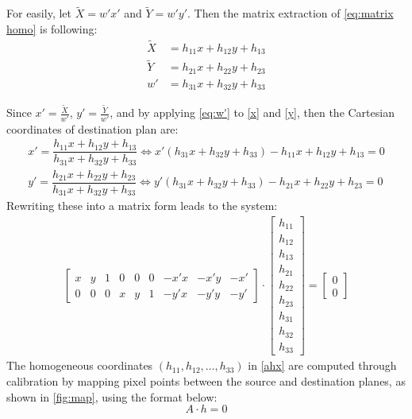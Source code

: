 \documentclass{rithy-thesis}
\begin{document}
\noindent For easily, let $\tilde{X} = w'x'$ and $\tilde{Y} = w'y'$. Then the matrix extraction of \eqref{eq:matrix homo} is following:
\begin{align}
    \tilde{X} &= h_{11}x+h_{12}y+h_{13} \label{x}\\
    \tilde{Y} &= h_{21}x+h_{22}y+h_{23} \label{y}\\
    w' &= h_{31}x+h_{32}y+h_{33} \label{eq:w'}
\end{align}

\noindent Since $x' = \frac{\tilde{X}}{w'}$, $y' = \frac{\tilde{Y}}{w'}$, and by applying \eqref{eq:w'} to \eqref{x} and \eqref{y}, then the Cartesian coordinates of destination plan are:
\begin{align}
    x' = \dfrac{h_{11}x+h_{12}y+h_{13}}{h_{31}x+h_{32}y+h_{33}} \Longleftrightarrow x'(h_{31}x+h_{32}y+h_{33}) - h_{11}x+h_{12}y+h_{13} = 0 \\
    y' = \dfrac{h_{21}x+h_{22}y+h_{23}}{h_{31}x+h_{32}y+h_{33}} \Longleftrightarrow y'(h_{31}x+h_{32}y+h_{33}) - h_{21}x+h_{22}y+h_{23} = 0
\end{align}
\noindent Rewriting these into a matrix form leads to the system:
\begin{align}
    \begin{bmatrix}
x & y & 1 & 0 & 0 & 0 & -x' x & -x' y & -x' \\
0 & 0 & 0 & x & y & 1 & -y' x & -y' y & -y'
\end{bmatrix}
\cdot
\begin{bmatrix}
h_{11} \\
h_{12} \\
h_{13} \\
h_{21} \\
h_{22} \\
h_{23} \\
h_{31} \\
h_{32} \\
h_{33}
\end{bmatrix}
=
\begin{bmatrix}
0 \\
0
\end{bmatrix}
\label{ahx}
\end{align}
The homogeneous coordinates \((h_{11}, h_{12}, \dots, h_{33})\) in \eqref{ahx} are computed through calibration by mapping pixel points between the source and destination planes, as shown in \autoref{fig:map}, using the format below:
\begin{equation}
    A\cdot h= 0
\end{equation}
\end{document}

